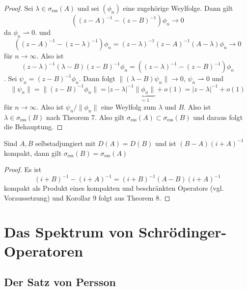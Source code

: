 \documentclass{mycourse}
\begin{document}
\begin{proof}
Sei $\lambda\in \sigma_{\text{ess}} (A)$ und sei $(\phi_n)$ eine zugehörige Weylfolge. Dann gilt
\[
((z-A)^{-1} - (z-B)^{-1})\phi_n \to 0
\]
da $\phi_n \rightharpoonup 0$. und
\[
((z-A)^{-1} - (z-\lambda)^{-1}) \phi_n = (z-\lambda)^{-1} (z-A)^{-1} (A- \lambda) \phi_n \to 0
\]
für $n\to \infty$. Also ist
\[
 (z-\lambda)^{-1} (\lambda- B) (z-B)^{-1} \phi_n = ((z-\lambda)^{-1} - (z-B)^{-1}) \phi_n 
\]
. Sei $\psi_n = (z-B)^{-1} \phi_n$. Dann folgt $\|(\lambda-B)\psi_n\| \to 0$, $\psi_n \rightharpoonup 0$ und
\[
\| \psi_n\| = \| (z- B)^{-1} \phi_n\| = |z-\lambda|^{-1} \underbrace{\| \phi_n \|}_{=1} + o(1)= |z-\lambda|^{-1} +o(1)
\]
für $n\to \infty$. Also ist $\psi_n/\|\phi_n\|$ eine Weylfolg zum $\lambda$ und $B$. Also ist $\lambda \in \sigma_{\text{ess}} (B)$ nach Theorem 7. Also gilt $\sigma_{\text{ess}}(A) \subset \sigma_{\text{ess}}(B)$ und daraus folgt die Behauptung.
\end{proof}

\begin{kor}
Sind $A,B$ selbstadjungiert mit $D(A) = D(B)$ und ist $(B-A) (i+A)^{-1}$ kompakt, dann gilt $\sigma_{\text{ess}}(B) = \sigma_{\text{ess}}(A)$
\end{kor}
\begin{proof}
Es ist
\[
(i+B)^{-1} - (i+A)^{-1} = (i+B)^{-1} (A-B) (i+A)^{-1}
\]
kompakt als Produkt eines kompakten und beschränkten Operators (vgl. Voraussetzung) und Korollar 9 folgt aus Theorem 8. 
\end{proof}

\chapter{Das Spektrum von Schrödinger-Operatoren}
\section{Der Satz von Persson}
\end{document}
